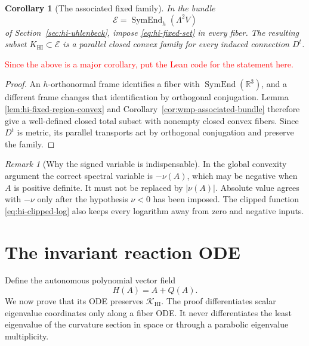 \documentclass[10pt]{coll-l}
\newtheorem{corollary}[theorem]{Corollary}
\theoremstyle{definition}
\theoremstyle{remark}
\newtheorem{remark}[theorem]{Remark}
\numberwithin{section}{chapter}
\numberwithin{equation}{chapter}
\begin{document}
\begin{corollary}[The associated fixed family]
\label{cor:hi-associated-fixed-family}
In the bundle
\[
          \mathcal E=\operatorname{SymEnd}_h(\Lambda^2V)
\]
of Section~\ref{sec:hi-uhlenbeck}, impose
\eqref{eq:hi-fixed-set} in every fiber.  The resulting subset
$K_{\mathrm{HI}}\subset\mathcal E$ is a parallel closed convex family for
every induced connection $D^t$.
\end{corollary}

\textcolor{red}{Since the above is a major corollary, put the Lean code for the statement here.}

\begin{proof}
An $h$-orthonormal frame identifies a fiber with
$\operatorname{SymEnd}(\mathbb R^3)$, and a different frame changes that
identification by orthogonal conjugation.  Lemma
\ref{lem:hi-fixed-region-convex} and
Corollary~\ref{cor:wmp-associated-bundle} therefore give a well-defined
closed total subset with nonempty closed convex fibers.  Since $D^t$ is
metric, its parallel transports act by orthogonal conjugation and preserve
the family.
\end{proof}

\begin{remark}[Why the signed variable is indispensable]
\label{rem:hi-signed-variable}
In the global convexity argument the correct spectral variable is
$-\nu(A)$, which may be negative when $A$ is positive definite.  It must
not be replaced by $|\nu(A)|$.  Absolute value agrees with $-\nu$ only
after the hypothesis $\nu<0$ has been imposed.  The clipped function
\eqref{eq:hi-clipped-log} also keeps every logarithm away from zero and
negative inputs.
\end{remark}

\section{The invariant reaction ODE}
\label{sec:hi-ode}

Define the autonomous polynomial vector field
\begin{equation}
                 H(A)=A+Q(A).                             \label{eq:hi-normalized-reaction}
\end{equation}
We now prove that its ODE preserves
$\mathcal K_{\mathrm{HI}}$.  The proof differentiates scalar eigenvalue
coordinates only along a fiber ODE.  It never differentiates the least
eigenvalue of the curvature section in space or through a parabolic
eigenvalue multiplicity.
\end{document}
